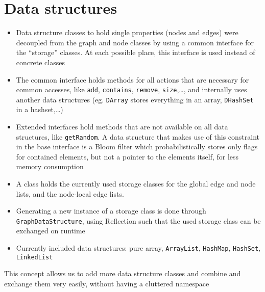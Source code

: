 \section{Data structures}
	\begin{itemize}
		\item Data structure classes to hold single properties (nodes and edges) were decoupled
			from the graph and node classes by using a common interface for the ``storage''
			classes. At each possible place, this interface is used instead of concrete classes
		\item The common interface holds methods for all actions that are necessary for common
			accesses, like \texttt{add}, \texttt{contains}, \texttt{remove}, \texttt{size},\ldots,
			and internally uses another data structures (eg. \texttt{DArray} stores everything in
			an array, \texttt{DHashSet} in a hashset,\ldots)
		\item Extended interfaces hold methods that are not available on all data structures,
			like \texttt{getRandom}. A data structure that makes use of this constraint in the base
			interface is a Bloom filter which probabilistically stores only flags for contained
			elements, but not a pointer to the elements itself, for less memory consumption
		\item A class holds the currently used storage classes for the global edge and node
			lists, and the node-local edge lists.
		\item Generating a new instance of a storage class is done through
			\texttt{GraphDataStructure}, using Reflection such that the used storage class can be
			exchanged on runtime
		\item Currently included data structures: pure array, \texttt{ArrayList},
			\texttt{HashMap}, \texttt{HashSet}, \texttt{LinkedList}
	\end{itemize}
	
	This concept allows us to add more data structure classes and combine and exchange them
	very easily, without having a cluttered namespace
